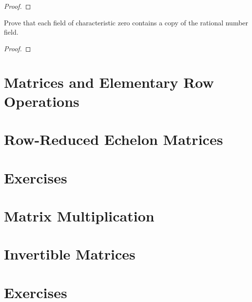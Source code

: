 \begin{proof}
\end{proof}

\begin{exercise}
    Prove that each field of characteristic zero contains a copy of the rational number field.
\end{exercise}

\begin{proof}
\end{proof}

\section{Matrices and Elementary Row Operations}

\section{Row-Reduced Echelon Matrices}

\section*{Exercises}

\section{Matrix Multiplication}

\section{Invertible Matrices}

\section*{Exercises}
